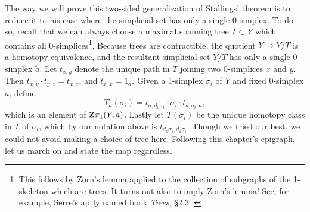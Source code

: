 The way we will prove this two-sided generalization of Stallings' theorem is to reduce it to his case where the simplicial set has only a single 0-simplex. To do so, recall that we can always choose a maximal spanning tree $T\subset Y$ which contains all 0-simplices\footnote{This follows by Zorn's lemma applied to the collection of subgraphs of the 1-skeleton which are trees. It turns out also to imply Zorn's lemma! See, for example, Serre's aptly named book \emph{Trees}, \S2.3 \cite{Serre1980}.}. Because trees are contractible, the quotient $Y\to Y/T$ is a homotopy equivalence, and the resultant simplicial set $Y/T$ has only a single 0-simplex $\tilde{a}$. Let $t_{x,y}$ denote the unique path in $T$ joining two 0-simplices $x$ and $y$. Then $t_{x,y} \cdot t_{y,z} = t_{x,z}$, and $t_{x,x} = 1_a$. Given a 1-simplex $\sigma_i$ of $Y$ and fixed 0-simplex $a$, define 
\[T_a(\sigma_i) = t_{a, d_0\sigma_i}\cdot \sigma_i \cdot t_{d_1\sigma_i, a},\]
which is an element of $\mathbf{Z}\pi_1(Y,a)$. Lastly let $T(\sigma_i)$ be the unique homotopy class in $T$ of $\sigma_i$, which by our notation above is $t_{d_0\sigma_i, d_1\sigma_i}$. Though we tried our best, we could not avoid making a choice of tree here. Following this chapter's epigraph, let us march on and state the map regardless.
